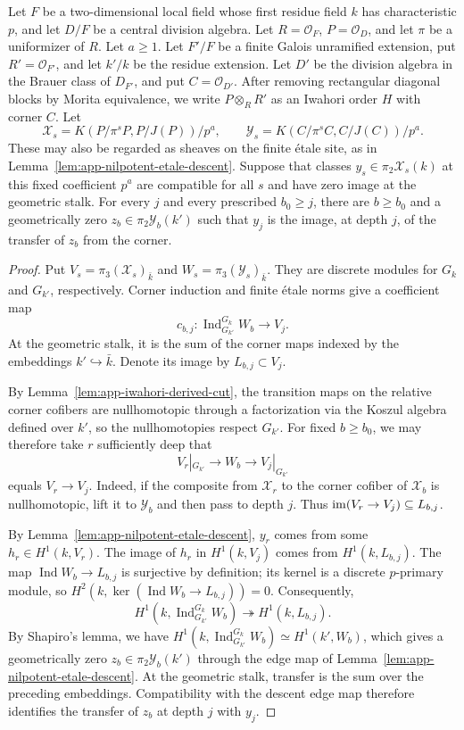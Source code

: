\begin{lemma}
\label{lem:review-corner-h-one-transfer}
Let $F$ be a two-dimensional local field whose first residue field $k$ has characteristic $p$, and let $D/F$ be a central division algebra.
Let $R=\mathcal O_F$, $P=\mathcal O_D$, and let $\pi$ be a uniformizer of $R$.
Let $a\ge1$.
Let $F'/F$ be a finite Galois unramified extension, put $R'=\mathcal O_{F'}$, and let $k'/k$ be the residue extension.
Let $D'$ be the division algebra in the Brauer class of $D_{F'}$, and put $C=\mathcal O_{D'}$.
After removing rectangular diagonal blocks by Morita equivalence, we write $P\otimes_RR'$ as an Iwahori order $H$ with corner $C$.
Let
\[
 \mathcal X_s=K(P/\pi^sP,P/J(P))/p^a,\qquad
 \mathcal Y_s=K(C/\pi^sC,C/J(C))/p^a.
\]
These may also be regarded as sheaves on the finite \'etale site, as in Lemma~\ref{lem:app-nilpotent-etale-descent}.
Suppose that classes $y_s\in\pi_2\mathcal X_s(k)$ at this fixed coefficient $p^a$ are compatible for all $s$ and have zero image at the geometric stalk.
For every $j$ and every prescribed $b_0\ge j$, there are $b\ge b_0$ and a geometrically zero $z_b\in\pi_2\mathcal Y_b(k')$ such that $y_j$ is the image, at depth $j$, of the transfer of $z_b$ from the corner.
\end{lemma}
\begin{proof}
Put $V_s=\pi_3(\mathcal X_s)_{\bar k}$ and $W_s=\pi_3(\mathcal Y_s)_{\bar k}$.
They are discrete modules for $G_k$ and $G_{k'}$, respectively.
Corner induction and finite \'etale norms give a coefficient map
\[
 c_{b,j}\colon\operatorname{Ind}_{G_{k'}}^{G_k}W_b\longrightarrow V_j.
\]
At the geometric stalk, it is the sum of the corner maps indexed by the embeddings $k'\hookrightarrow\bar k$.
Denote its image by $L_{b,j}\subset V_j$.

By Lemma~\ref{lem:app-iwahori-derived-cut}, the transition maps on the relative corner cofibers are nullhomotopic through a factorization via the Koszul algebra defined over $k'$, so the nullhomotopies respect $G_{k'}$.
For fixed $b\ge b_0$, we may therefore take $r$ sufficiently deep that
\[
 V_r|_{G_{k'}}\longrightarrow W_b\longrightarrow V_j|_{G_{k'}}
\]
equals $V_r\to V_j$.
Indeed, if the composite from $\mathcal X_r$ to the corner cofiber of $\mathcal X_b$ is nullhomotopic, lift it to $\mathcal Y_b$ and then pass to depth $j$.
Thus $\operatorname{im}(V_r\to V_j)\subseteq L_{b,j}$.

By Lemma~\ref{lem:app-nilpotent-etale-descent}, $y_r$ comes from some $h_r\in H^1(k,V_r)$.
The image of $h_r$ in $H^1(k,V_j)$ comes from $H^1(k,L_{b,j})$.
The map $\operatorname{Ind}W_b\to L_{b,j}$ is surjective by definition; its kernel is a discrete $p$-primary module, so $H^2(k,\ker(\operatorname{Ind}W_b\to L_{b,j}))=0$.
Consequently,
\[
 H^1(k,\operatorname{Ind}_{G_{k'}}^{G_k}W_b)
 \twoheadrightarrow H^1(k,L_{b,j}).
\]
By Shapiro's lemma, we have $H^1(k,\operatorname{Ind}_{G_{k'}}^{G_k}W_b)\simeq H^1(k',W_b)$, which gives a geometrically zero $z_b\in\pi_2\mathcal Y_b(k')$ through the edge map of Lemma~\ref{lem:app-nilpotent-etale-descent}.
At the geometric stalk, transfer is the sum over the preceding embeddings.
Compatibility with the descent edge map therefore identifies the transfer of $z_b$ at depth $j$ with $y_j$.
\end{proof}

